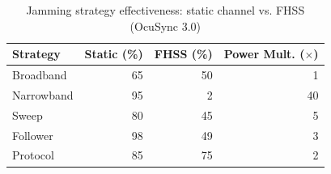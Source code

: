 \begin{table}[htbp]
\centering
\caption{Jamming strategy effectiveness: static channel vs. FHSS (OcuSync 3.0)}
\label{tab:fhss_effectiveness}
\begin{tabular}{lrrr}
\toprule
Strategy & Static (\%) & FHSS (\%) & Power Mult. ($\times$) \\
\midrule
Broadband & 65 & 50 & 1 \\
Narrowband & 95 & 2 & 40 \\
Sweep & 80 & 45 & 5 \\
Follower & 98 & 49 & 3 \\
Protocol & 85 & 75 & 2 \\
\bottomrule
\end{tabular}
\end{table}